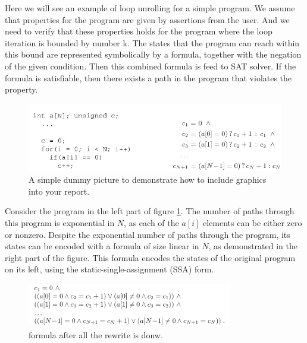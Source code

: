 \documentclass[14pt]{article}
\begin{document}
Here we will see an example of loop unrolling for a simple program. We assume that properties for the program are given by assertions from  the user. And we need to verify that these properties holds for the program where the loop iteration is bounded by number k. The states that the program can reach within this bound are represented symbolically by a formula, together with the negation of the given condition. Then this combined formula is feed to SAT solver. If the formula is satisfiable, then there exists a path in the program that violates the property.

\begin{figure}[htb!]
  \begin{centering}
    \includegraphics[width=\textwidth]{figures/bmc-example-1}\par
  \end{centering}
  \caption{A simple dummy picture to demonstrate how
           to include graphics into your report.}
  \label{fig:mesh1}
\end{figure}



Consider the program in the left part of figure \ref{fig:mesh1}. The number of paths through this program is exponential in \(N\), as each of the \(a[i]\) elements can be either zero or nonzero. Despite the exponential number of paths through the program, its states can be encoded with a formula of size linear in \(N\), as demonstrated in the right part of the figure. This formula encodes the states of the original program on its left, using the static-single-assignment (SSA) form. 		 	 	 		

\begin{figure}[htb!]
  \begin{centering}
    \includegraphics[width=0.80\textwidth]{figures/bmc-example-2}\par
  \end{centering}
  \caption{formula after all the rewrite is donw.}
  \label{fig:mesh2}
\end{figure}
\end{document}
